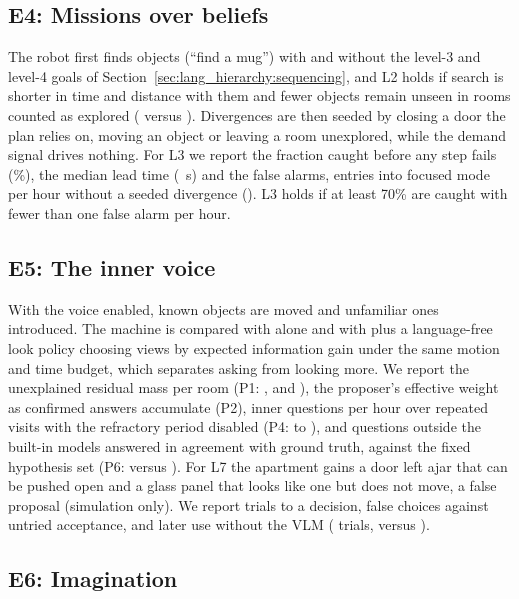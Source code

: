 \subsection{E4: Missions over beliefs}
\label{sec:experiments:e4}

The robot first finds objects (``find a mug'') with and without the level-3 and level-4 goals of
Section~\ref{sec:lang_hierarchy:sequencing}, and L2 holds if search is shorter in time and distance with them and
fewer objects remain unseen in rooms counted as explored (\result{--} versus \result{--}). Divergences are then seeded
by closing a door the plan relies on, moving an object or leaving a room unexplored, while the demand signal drives
nothing. For L3 we report the fraction caught before any step fails (\result{--}\%), the median lead time
(\result{--}~s) and the false alarms, entries into focused mode per hour without a seeded divergence
(\result{--}). L3 holds if at least 70\% are caught with fewer than one false alarm per hour.

\subsection{E5: The inner voice}
\label{sec:experiments:e5}

With the voice enabled, known objects are moved and unfamiliar ones introduced. The machine is compared with \cortex{}
alone and with \cortex{} plus a language-free look policy choosing views by expected information gain under the same
motion and time budget, which separates asking from looking more. We report the unexplained residual mass per room
(P1: \result{--}, \result{--} and \result{--}), the proposer's effective weight as confirmed answers accumulate (P2),
inner questions per hour over repeated visits with the refractory period disabled (P4: \result{--} to \result{--}), and
questions outside the built-in models answered in agreement with ground truth, against the fixed hypothesis set (P6:
\result{--} versus \result{--}). For L7 the apartment gains a door left ajar that can be pushed open and a glass panel
that looks like one but does not move, a false proposal (simulation only). We report trials to a decision, false choices against untried acceptance, and
later use without the VLM (\result{--} trials, \result{--} versus \result{--}).

\subsection{E6: Imagination}
\label{sec:experiments:e6}

